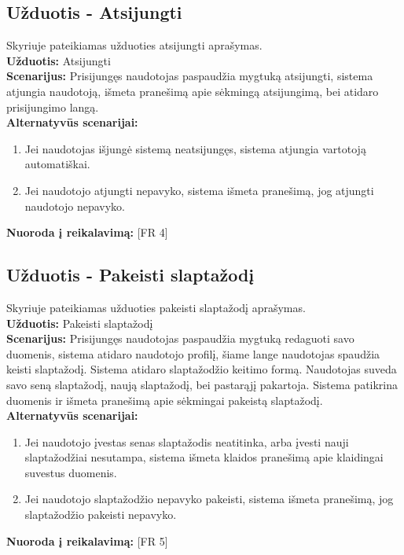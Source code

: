\documentclass{VUMIFPSkursinis}
\begin{document}
	\subsection{Užduotis - Atsijungti}
	Skyriuje pateikiamas užduoties atsijungti aprašymas.\\
	\textbf{Užduotis:}  Atsijungti \\
	\textbf{Scenarijus:} Prisijungęs naudotojas paspaudžia mygtuką atsijungti, sistema atjungia naudotoją, išmeta pranešimą apie sėkmingą atsijungimą, bei atidaro prisijungimo langą. \\
	\textbf{Alternatyvūs scenarijai:}
	\begin{enumerate}
		\item Jei naudotojas išjungė sistemą neatsijungęs, sistema atjungia vartotoją automatiškai. 
		\item Jei naudotojo atjungti nepavyko, sistema išmeta pranešimą, jog  atjungti naudotojo nepavyko. 
	\end{enumerate}
	\textbf{Nuoroda į reikalavimą: } [FR 4]
	
	\subsection{Užduotis - Pakeisti slaptažodį}
	Skyriuje pateikiamas užduoties pakeisti slaptažodį aprašymas.\\
	\textbf{Užduotis:}  Pakeisti slaptažodį \\
	\textbf{Scenarijus:} Prisijungęs naudotojas paspaudžia mygtuką redaguoti savo duomenis, sistema atidaro naudotojo profilį, šiame lange naudotojas spaudžia keisti slaptažodį. Sistema atidaro slaptažodžio keitimo formą. Naudotojas suveda savo seną slaptažodį, naują slaptažodį, bei pastarąjį pakartoja. Sistema patikrina duomenis ir išmeta pranešimą apie sėkmingai pakeistą slaptažodį. \\
	\textbf{Alternatyvūs scenarijai:}
	\begin{enumerate}
		\item Jei naudotojo įvestas senas slaptažodis neatitinka, arba įvesti nauji slaptažodžiai nesutampa, sistema išmeta klaidos pranešimą apie klaidingai suvestus duomenis. 
		\item Jei naudotojo slaptažodžio nepavyko pakeisti, sistema išmeta pranešimą, jog slaptažodžio pakeisti nepavyko. 
	\end{enumerate}
	\textbf{Nuoroda į reikalavimą: } [FR 5]
	
\end{document}
